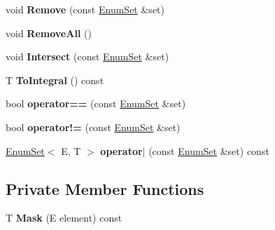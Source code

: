 \begin{DoxyCompactItemize}
\item 
void {\bfseries Remove} (const \hyperlink{classv8_1_1internal_1_1_enum_set}{Enum\+Set} \&set)\hypertarget{classv8_1_1internal_1_1_enum_set_a06cae32ab5465dc2c5676c7ef2617e6a}{}\label{classv8_1_1internal_1_1_enum_set_a06cae32ab5465dc2c5676c7ef2617e6a}

\item 
void {\bfseries Remove\+All} ()\hypertarget{classv8_1_1internal_1_1_enum_set_a43cbbc3281c551f18b3d156005272a34}{}\label{classv8_1_1internal_1_1_enum_set_a43cbbc3281c551f18b3d156005272a34}

\item 
void {\bfseries Intersect} (const \hyperlink{classv8_1_1internal_1_1_enum_set}{Enum\+Set} \&set)\hypertarget{classv8_1_1internal_1_1_enum_set_aa04525460c1a2f5967bd65979e8c29a7}{}\label{classv8_1_1internal_1_1_enum_set_aa04525460c1a2f5967bd65979e8c29a7}

\item 
T {\bfseries To\+Integral} () const \hypertarget{classv8_1_1internal_1_1_enum_set_a5c4ea283f611fd20cf3e217ff4f86262}{}\label{classv8_1_1internal_1_1_enum_set_a5c4ea283f611fd20cf3e217ff4f86262}

\item 
bool {\bfseries operator==} (const \hyperlink{classv8_1_1internal_1_1_enum_set}{Enum\+Set} \&set)\hypertarget{classv8_1_1internal_1_1_enum_set_a77b1d6ab479998ace55f445a9b517e09}{}\label{classv8_1_1internal_1_1_enum_set_a77b1d6ab479998ace55f445a9b517e09}

\item 
bool {\bfseries operator!=} (const \hyperlink{classv8_1_1internal_1_1_enum_set}{Enum\+Set} \&set)\hypertarget{classv8_1_1internal_1_1_enum_set_a8fa403add1ad907344e9f4f86abec24f}{}\label{classv8_1_1internal_1_1_enum_set_a8fa403add1ad907344e9f4f86abec24f}

\item 
\hyperlink{classv8_1_1internal_1_1_enum_set}{Enum\+Set}$<$ E, T $>$ {\bfseries operator$\vert$} (const \hyperlink{classv8_1_1internal_1_1_enum_set}{Enum\+Set} \&set) const \hypertarget{classv8_1_1internal_1_1_enum_set_ac1e911226bcaa21e72bc344fced8c24d}{}\label{classv8_1_1internal_1_1_enum_set_ac1e911226bcaa21e72bc344fced8c24d}

\end{DoxyCompactItemize}
\subsection*{Private Member Functions}
\begin{DoxyCompactItemize}
\item 
T {\bfseries Mask} (E element) const \hypertarget{classv8_1_1internal_1_1_enum_set_a98f23c0534abf1cfe67a82bf21a6b9fa}{}\label{classv8_1_1internal_1_1_enum_set_a98f23c0534abf1cfe67a82bf21a6b9fa}

\end{DoxyCompactItemize}
